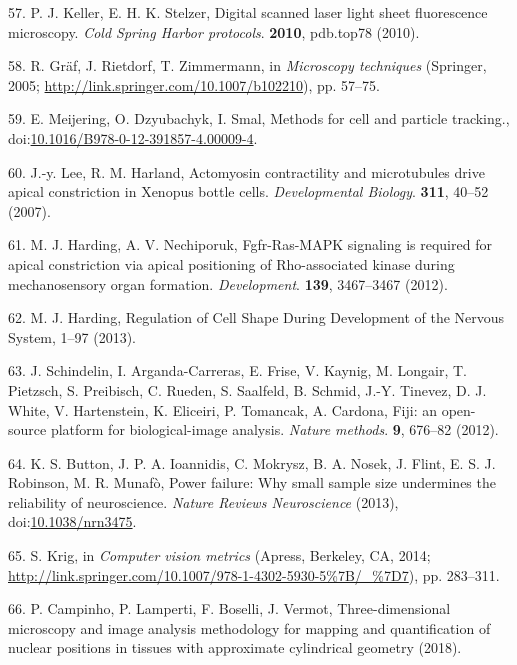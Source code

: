 \documentclass[11pt,singlespacinge,twoside]{reedthesis} %
\theoremstyle{definition}
\theoremstyle{definition}
\theoremstyle{definition}
\theoremstyle{remark}
\begin{document}
\leavevmode\hypertarget{ref-Keller2010c}{}%
57. P. J. Keller, E. H. K. Stelzer, Digital scanned laser light sheet fluorescence microscopy. \emph{Cold Spring Harbor protocols}. \textbf{2010}, pdb.top78 (2010).

\leavevmode\hypertarget{ref-Graf2005}{}%
58. R. Gräf, J. Rietdorf, T. Zimmermann, in \emph{Microscopy techniques} (Springer, 2005; \url{http://link.springer.com/10.1007/b102210}), pp. 57--75.

\leavevmode\hypertarget{ref-Meijering2012}{}%
59. E. Meijering, O. Dzyubachyk, I. Smal, Methods for cell and particle tracking., doi:\href{https://doi.org/10.1016/B978-0-12-391857-4.00009-4}{10.1016/B978-0-12-391857-4.00009-4}.

\leavevmode\hypertarget{ref-Lee2009}{}%
60. J.-y. Lee, R. M. Harland, Actomyosin contractility and microtubules drive apical constriction in Xenopus bottle cells. \emph{Developmental Biology}. \textbf{311}, 40--52 (2007).

\leavevmode\hypertarget{ref-Harding2012}{}%
61. M. J. Harding, A. V. Nechiporuk, Fgfr-Ras-MAPK signaling is required for apical constriction via apical positioning of Rho-associated kinase during mechanosensory organ formation. \emph{Development}. \textbf{139}, 3467--3467 (2012).

\leavevmode\hypertarget{ref-Harding2013}{}%
62. M. J. Harding, Regulation of Cell Shape During Development of the Nervous System, 1--97 (2013).

\leavevmode\hypertarget{ref-Schindelin2012}{}%
63. J. Schindelin, I. Arganda-Carreras, E. Frise, V. Kaynig, M. Longair, T. Pietzsch, S. Preibisch, C. Rueden, S. Saalfeld, B. Schmid, J.-Y. Tinevez, D. J. White, V. Hartenstein, K. Eliceiri, P. Tomancak, A. Cardona, Fiji: an open-source platform for biological-image analysis. \emph{Nature methods}. \textbf{9}, 676--82 (2012).

\leavevmode\hypertarget{ref-Button2013}{}%
64. K. S. Button, J. P. A. Ioannidis, C. Mokrysz, B. A. Nosek, J. Flint, E. S. J. Robinson, M. R. Munafò, Power failure: Why small sample size undermines the reliability of neuroscience. \emph{Nature Reviews Neuroscience} (2013), doi:\href{https://doi.org/10.1038/nrn3475}{10.1038/nrn3475}.

\leavevmode\hypertarget{ref-Krig2014}{}%
65. S. Krig, in \emph{Computer vision metrics} (Apress, Berkeley, CA, 2014; \url{http://link.springer.com/10.1007/978-1-4302-5930-5\%7B/_\%7D7}), pp. 283--311.

\leavevmode\hypertarget{ref-Campinho2018}{}%
66. P. Campinho, P. Lamperti, F. Boselli, J. Vermot, Three-dimensional microscopy and image analysis methodology for mapping and quantification of nuclear positions in tissues with approximate cylindrical geometry (2018).
\end{document}
